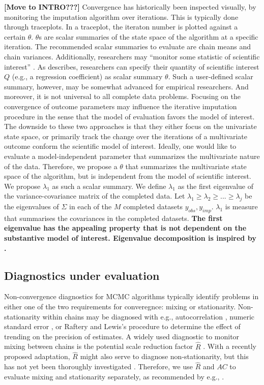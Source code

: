 \documentclass[Royal,times,sageh]{sagej}
\begin{document}
\textbf{{[}Move to INTRO???{]}} Convergence has historically been inspected visually, by monitoring the imputation algorithm over iterations. This is typically done through traceplots. In a traceplot, the iteraton number is plotted against a certain \(\theta\). \(\theta\)s are scalar summaries of the state space of the algorithm at a specific iteration. The recommended scalar summaries to evaluate are chain means and chain variances. Additionally, researchers may ``monitor some statistic of scientific interest'' \citep[\(\S\) 6.5.2]{buur18}. As \citet{buur18} describes, researchers can specify their quantity of scientific interest \(Q\) (e.g., a regression coefficient) as scalar summary \(\theta\). Such a user-defined scalar summary, however, may be somewhat advanced for empirical researchers. And moreover, it is not universal to all complete data problems. Focusing on the convergence of outcome parameters may influence the iterative imputation procedure in the sense that the model of evaluation favors the model of interest. The downside to these two approaches is that they either focus on the univariate state space, or primarily track the change over the iterations of a multivariate outcome conform the scientific model of interest. Ideally, one would like to evaluate a model-independent parameter that summarizes the multivariate nature of the data. Therefore, we propose a \(\theta\) that summarizes the multivariate state space of the algorithm, but is independent from the model of scientific interest. We propose \(\lambda_1\) as such a scalar summary. We define \(\lambda_1\) as the first eigenvalue of the variance-covariance matrix of the completed data. Let \(\lambda_1 \geq \lambda_2 \geq ... \geq \lambda_j\) be the eigenvalues of \(\Sigma\) in each of the \(M\) completed datasets \({y_{obs}, y_{imp}}\). \(\lambda_1\) is measure that summarises the covariances in the completed datasets. \textbf{The first eigenvalue has the appealing property that is not dependent on the substantive model of interest. Eigenvalue decomposition is inspired by \citet{mack03}.}

\hypertarget{diagnostics-under-evaluation}{%
\subsection{Diagnostics under evaluation}\label{diagnostics-under-evaluation}}

Non-convergence diagnostics for MCMC algorithms typically identify problems in either one of the two requirements for converegnce: mixing or stationarity. Non-stationarity within chains may be diagnosed with e.g., autocorrelation \citep[\(AC\);][]{scha97, gelm13}, numeric standard error \citep[`MC error';][]{gewe92}, or Raftery and Lewis's \citeyearpar{raft91} procedure to determine the effect of trending on the precision of estimates. A widely used diagnostic to monitor mixing between chains is the potential scale reduction factor \(\widehat{R}\) \citep[`Gelman-Rubin statistic';][]{gelm92}. With a recently proposed adaptation, \(\widehat{R}\) might also serve to diagnose non-stationarity, but this has not yet been thoroughly investigated \citep{veht19}. Therefore, we use \(\widehat{R}\) and \(AC\) to evaluate mixing and stationarity separately, as recommended by e.g., \citet{cowl96}.
\end{document}
